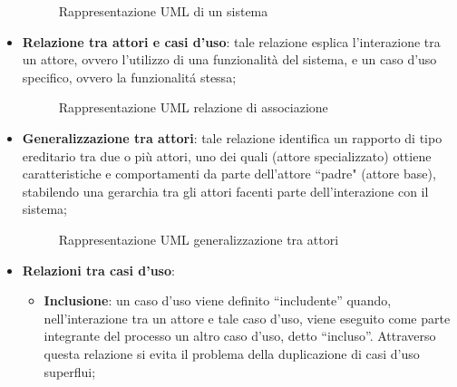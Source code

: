 \begin{itemize}
        \begin{figure}[H]
            \centering
            \caption{Rappresentazione UML di un sistema}
            \label{fig:Rappresentazione UML di un sistema}
        \end{figure}
    \item \textbf{Relazione tra attori e casi d'uso}: tale relazione esplica l'interazione tra un attore, ovvero l'utilizzo di una funzionalità del sistema, e un caso d'uso specifico, ovvero la funzionalitá stessa;
        \begin{figure}[H]
            \centering
            \caption{Rappresentazione UML relazione di associazione}
            \label{fig:Rappresentazione UML relazione di associazione}
        \end{figure}
    \item \textbf{Generalizzazione tra attori}: tale relazione identifica un rapporto di tipo ereditario tra due o più attori, uno dei quali (attore specializzato) ottiene caratteristiche e comportamenti da parte dell'attore ``padre" (attore base), stabilendo una gerarchia tra gli attori facenti parte dell'interazione con il sistema;
        \begin{figure}[H]
            \centering
            \caption{Rappresentazione UML generalizzazione tra attori}
            \label{fig:Rappresentazione UML generalizzazione tra attori}
        \end{figure}
    \item \textbf{Relazioni tra casi d'uso}: 
        \begin{itemize}
        \item \textbf{Inclusione}: un caso d'uso viene definito ``includente'' quando, nell'interazione tra un attore e tale caso d'uso, viene eseguito come parte integrante del processo un altro caso d'uso, detto ``incluso''. Attraverso questa relazione si evita il problema della duplicazione di casi d'uso superflui; 

\end{itemize}
\end{itemize}
